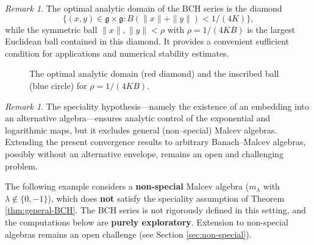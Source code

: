 \documentclass[11pt]{amsart}
\numberwithin{equation}{section}
\theoremstyle{remark}
\newtheorem{remark}[theorem]{Remark}
\begin{document}
\begin{remark}
The optimal analytic domain of the BCH series is the diamond
\[
\{(x,y)\in\mathfrak g\times\mathfrak g : B(\|x\|+\|y\|)<1/(4K)\},
\]
while the symmetric ball $\|x\|,\|y\|<\rho$ with $\rho=1/(4KB)$ is the largest Euclidean ball contained in this diamond. It provides a convenient sufficient condition for applications and numerical stability estimates.
\end{remark}

\begin{figure}[h]
\centering
{}
\caption{The optimal analytic domain (red diamond) and the inscribed ball (blue circle) for $\rho = 1/(4KB)$.}
\label{fig:diamond-ball}
\end{figure}

\begin{remark}\label{nassim8}
The speciality hypothesis—namely the existence of an embedding into an alternative algebra—ensures analytic control of the exponential and logarithmic maps, but it excludes general (non--special) Malcev algebras. Extending the present convergence results to arbitrary Banach--Malcev algebras, possibly without an alternative envelope, remains an open and challenging problem.
\end{remark}

The following example considers a \textbf{non-special} 
Malcev algebra ($m_\lambda$ with $\lambda \notin \{0,-1\}$), 
which does \textbf{not} satisfy the speciality assumption of 
Theorem \ref{thm:general-BCH}. The BCH series is not 
rigorously defined in this setting, and the computations 
below are \textbf{purely exploratory}. Extension to 
non-special algebras remains an open challenge 
(see Section \ref{sec:non-special}).
\end{document}
